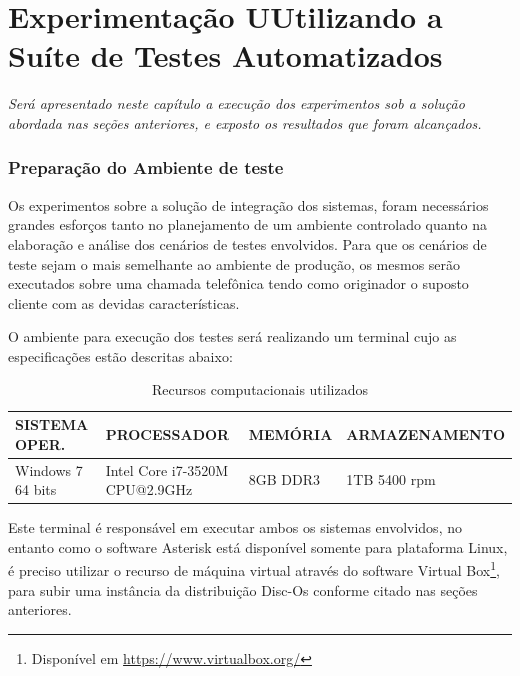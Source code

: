 \chapter[Experimentação Utilizando a Suíte de Testes Automatizados]{\textbf{E}xperimentação \textbf{U}Utilizando a \textbf{S}uíte de \textbf{T}estes \textbf{A}utomatizados}

\textit{Será apresentado neste capítulo a execução dos experimentos sob a solução abordada nas seções anteriores, e exposto os resultados que foram alcançados.}


\subsection{Preparação do Ambiente de teste}

Os experimentos sobre a solução de integração dos sistemas, foram necessários grandes esforços tanto no planejamento de um ambiente controlado quanto na elaboração e análise dos cenários de testes envolvidos. Para que os cenários de teste sejam o mais semelhante ao ambiente de produção, os mesmos serão executados sobre uma chamada telefônica tendo como originador o suposto cliente com as devidas características. 

O ambiente para execução dos testes será realizando um terminal cujo as especificações estão descritas abaixo:

\begin{table}[htb]
	\footnotesize
	\caption{Recursos computacionais utilizados}
	\label{tabela:recursosUtilizados}
	\begin{tabular}{|p{3.5cm}|p{3cm}|p{2cm}|p{4cm}|} \hline
		\textbf{SISTEMA OPER.} 	& \textbf{PROCESSADOR} 				& \textbf{MEMÓRIA} 	& \textbf{ARMAZENAMENTO}  \\ \hline
		Windows 7 64 bits 		& Intel Core i7-3520M CPU@2.9GHz 	& 8GB DDR3			& 1TB 5400 rpm \\ \hline
	\end{tabular}
\end{table}

Este terminal é responsável em executar ambos os sistemas envolvidos, no entanto como o software Asterisk está disponível somente para plataforma Linux, é preciso utilizar o recurso de máquina virtual através do software Virtual Box\footnote{Disponível em \url{https://www.virtualbox.org/}}, para subir uma instância da distribuição Disc-Os conforme citado nas seções anteriores.
 
